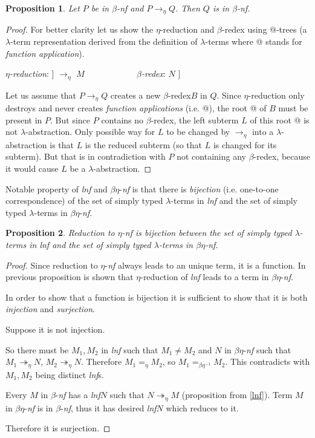 \documentclass{sig-alternate}
\makeatletter
\newtheorem{proposition}{Proposition}
\newcommand{\Lets}{Let us\xspace}
\newcommand{\lets}{let us\xspace}
\newcommand{\lterm}{$\lambda$-term\xspace}
\newcommand{\lterms}{$\lambda$-terms\xspace}
\newcommand{\atTree}{@-tree\xspace}
\newcommand{\lh}[1]{\lambda #1}
\newcommand{\etar}{\twoheadrightarrow_\eta}
\newcommand{\ered}{$\eta$-reduction\xspace}
\newcommand{\bnf}{$\beta$-\textit{nf}\xspace}
\newcommand{\enf}{$\eta$-\textit{nf}\xspace}
\newcommand{\benf}{$\beta\eta$-\textit{nf}\xspace}
\newcommand{\bredex}{$\beta$-redex\xspace}
\newcommand{\lnf}{\textit{lnf}\xspace}
\newcommand{\eArrow}{\rightarrow_\eta\xspace}
\makeatother
\begin{document}
\begin{proposition}
Let $P$ be in \bnf and $P \eArrow Q$. Then $Q$ is in \bnf.    
\end{proposition}
\begin{proof}

For better clarity \lets show the \ered and \bredex using \atTree{}s 
(a \lterm representation derived from the definition of \lterms 
where @ stands for \textit{function application}).

\textit{\ered}: \Tree [.$\lh{x}$ [.@ $M$ $x$ ] ] 
$\eArrow$
$M$ 
~~~~~~~~~~~
\textit{\bredex}: \Tree [.@ [.$\lh{x}$ $M$ ] $N$ ] 

\Lets assume that $P \eArrow Q$ creates a new \bredex $B$ in $Q$.
Since \ered only destroys and never creates \textit{function applications} (i.e. @),
the root @ of $B$ must be present in $P$.  
But since $P$ contains no \bredex, the left subterm $L$ of this root @
is not $\lambda$-abstraction.
Only possible way for $L$ to be changed by $\eArrow$ into 
a $\lambda$-abstraction is that $L$ is the reduced subterm (so that
$L$ is changed for its subterm).
But that is in contradiction with $P$ not containing any \bredex,
because it would cause $L$ be a $\lambda$-abstraction.
\end{proof}

Notable property of \lnf and \benf is that there is \textit{bijection} 
(i.e. one-to-one correspondence) of 
the set of simply typed \lterms in \lnf and 
the set of simply typed \lterms in \benf.

\begin{proposition}

Reduction to \enf is bijection between  
the set of simply typed \lterms in \lnf and 
the set of simply typed \lterms in \benf.
\end{proposition}
\begin{proof}

Since reduction to \enf always leads to an unique term, it is a function.
In previous proposition is shown that \ered of \lnf
leads to a term in \benf.

In order to show that a function is bijection it is sufficient to show that it is
both \textit{injection} and \textit{surjection}.

Suppose it is not injection.

So there must be $M_1,M_2$ in \lnf such that $M_1 \not= M_2$
and $N$ in \benf such that $M_1 \etar N$, $M_2 \etar N$.
Therefore $M_1 =_\eta M_2$, 
so $M_1 =_{\beta\eta^{-1}} M_2$.
This contradicts with $M_1,M_2$ being distinct \lnf{}s.

Every $M$ in \bnf has a \lnf $N$ such that 
$N \twoheadrightarrow_{\eta} M$ (proposition from \ref{lnf}).
Term $M$ in \benf is in \bnf, thus it has desired \lnf $N$
which reduces to it. 

Therefore it is surjection. 
\end{proof}
\end{document}
